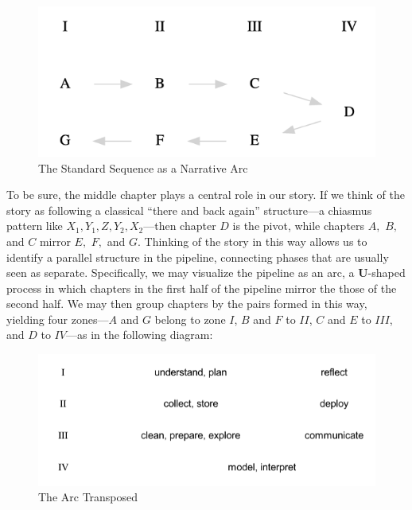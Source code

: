 \documentclass[
  letterpaper,
]{report}
\begin{document}
\begin{figure}

{\centering \includegraphics{chapters/02_Structure/images/image1.png}

}

\caption{The Standard Sequence as a Narrative Arc}

\end{figure}

To be sure, the middle chapter plays a central role in our story. If we
think of the story as following a classical ``there and back again''
structure---a chiasmus pattern like \(X_1, Y_1, Z, Y_2, X_2\)---then
chapter \(D\) is the pivot, while chapters \(A,\) \(B,\) and \(C\)
mirror \(E,\) \(F,\) and \(G\). Thinking of the story in this way allows
us to identify a parallel structure in the pipeline, connecting phases
that are usually seen as separate. Specifically, we may visualize the
pipeline as an arc, a \textbf{U}-shaped process in which chapters in the
first half of the pipeline mirror the those of the second half. We may
then group chapters by the pairs formed in this way, yielding four
zones---\(A\) and \(G\) belong to zone \(I\), \(B\) and \(F\) to \(II\),
\(C\) and \(E\) to \(III\), and \(D\) to \(IV\)---as in the following
diagram:

\begin{figure}

{\centering \includegraphics{chapters/02_Structure/images/image2.png}

}

\caption{The Arc Transposed}

\end{figure}
\end{document}
